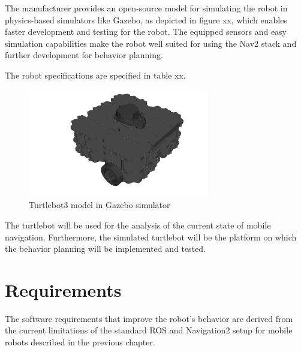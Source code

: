 The manufacturer provides an open-source model for simulating the robot in physics-based simulators like Gazebo, as depicted in figure xx, which enables faster development and testing for the robot. 
The equipped sensors and easy simulation capabilities make the robot well suited for using the Nav2 stack and further development for behavior planning. 

The robot specifications are specified in table xx.  \\

\begin{figure}[h!]
	\includegraphics[width=0.7\textwidth]{images/turtlebot_sim.png}
	\caption{Turtlebot3 model in Gazebo simulator}
\end{figure}

The turtlebot will be used for the analysis of the current state of mobile navigation. Furthermore, the simulated turtlebot will be the platform on which the behavior planning will be implemented and tested.\\


\section{Requirements}

The software requirements that improve the robot's behavior are derived from the current limitations of the standard ROS and Navigation2 setup for mobile robots described in the previous chapter.

